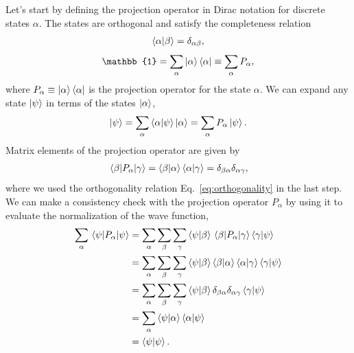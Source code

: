 \documentclass[preprintnumbers,floatfix,aps,prc,preprint,nofootinbib]{revtex4-1}
\begin{document}
Let's start by defining the projection operator in Dirac notation for discrete states $\alpha$.
The states are orthogonal and satisfy the completeness relation
%
\begin{align}
    \label{eq:orthogonality}
    \bra{\alpha} \ket{\beta} = \delta_{\alpha \beta},
\end{align}
%
\begin{align}
    \label{eq:completeness}
    \mathbb{1} = \sum_{\alpha} \ket{\alpha} \bra{\alpha} \equiv \sum_{\alpha} P_{\alpha},
\end{align}
%
where $P_{\alpha} \equiv \ket{\alpha} \bra{\alpha}$ is the projection operator for the state $\alpha$.
We can expand any state $\ket{\psi}$ in terms of the states $\ket{\alpha}$,
%
\begin{align}
    \label{eq:expansion_of_psi}
    \ket{\psi} = \sum_{\alpha} \bra{\alpha} \ket{\psi} \ket{\alpha} = \sum_{\alpha} P_{\alpha} \ket{\psi}.
\end{align}
%
Matrix elements of the projection operator are given by
%
\begin{align}
    \label{eq:projection_operator}
    \mel{\beta}{P_{\alpha}}{\gamma} = \bra{\beta} \ket{\alpha} \bra{\alpha} \ket{\gamma} = \delta_{\beta \alpha} \delta_{\alpha \gamma},
\end{align}
%
where we used the orthogonality relation Eq.~\eqref{eq:orthogonality} in the last step.
We can make a consistency check with the projection operator $P_{\alpha}$ by using it to evaluate the normalization of the wave function,
%
\begin{align}
    \label{eq:normalization}
    \sum_{\alpha} \mel{\psi}{P_{\alpha}}{\psi} &= \sum_{\alpha} \sum_{\beta} \sum_{\gamma} \bra{\psi} \ket{\beta} \mel{\beta}{P_{\alpha}}{\gamma} \bra{\gamma} \ket{\psi} \nonumber \\
    &= \sum_{\alpha} \sum_{\beta} \sum_{\gamma} \bra{\psi} \ket{\beta} \bra{\beta} \ket{\alpha} \bra{\alpha} \ket{\gamma} \bra{\gamma} \ket{\psi} \nonumber \\
    &= \sum_{\alpha} \sum_{\beta} \sum_{\gamma} \bra{\psi} \ket{\beta} \delta_{\beta \alpha} \delta_{\alpha \gamma} \bra{\gamma} \ket{\psi} \nonumber \\
    &= \sum_{\alpha} \bra{\psi} \ket{\alpha} \bra{\alpha} \ket{\psi} \nonumber \\
    &= \bra{\psi} \ket{\psi}.
\end{align}
%
\end{document}

